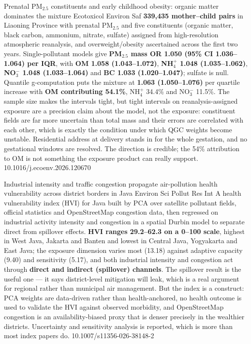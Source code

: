 \documentclass[10pt]{article}
\begin{document}

{Prenatal PM$_{2.5}$ constituents and early childhood obesity: organic matter dominates the mixture}
{Ecotoxicol Environ Saf}
{\textbf{339{,}435 mother--child pairs} in Liaoning Province with prenatal PM$_{2.5}$ and
five constituents (organic matter, black carbon, ammonium, nitrate, sulfate) assigned from
high-resolution atmospheric reanalysis, and overweight/obesity ascertained across the first
two years. Single-pollutant models give \textbf{PM$_{2.5}$ mass OR 1.050 (95\% CI
1.036--1.064) per IQR}, with \textbf{OM 1.058 (1.043--1.072)}, \textbf{NH$_4^+$ 1.048
(1.035--1.062)}, \textbf{NO$_3^-$ 1.048 (1.033--1.064)} and \textbf{BC 1.033
(1.020--1.047)}; sulfate is null. Quantile g-computation puts the mixture at \textbf{1.063
(1.050--1.076)} per quartile increase with \textbf{OM contributing 54.1\%}, NH$_4^+$ 34.4\%
and NO$_3^-$ 11.5\%. The sample size makes the intervals tight, but tight intervals on
reanalysis-assigned exposure are a precision claim about the model, not the exposure:
constituent fields are far more uncertain than total mass and their errors are correlated
with each other, which is exactly the condition under which QGC weights become unstable.
Residential address at delivery stands in for the whole gestation, and no gestational
windows are resolved. The direction is credible; the 54\% attribution to OM is not
something the exposure product can really support.}
{10.1016/j.ecoenv.2026.120670}


{Industrial intensity and traffic congestion propagate air-pollution health vulnerability across district borders in Java}
{Environ Sci Pollut Res Int}
{A health vulnerability index (HVI) for Java built by PCA over satellite pollutant fields,
official statistics and OpenStreetMap congestion data, then regressed on industrial
activity intensity and congestion in a spatial Durbin model to separate direct from
spillover effects. \textbf{HVI ranges 29.2--62.3 on a 0--100 scale}, highest in West Java,
Jakarta and Banten and lowest in Central Java, Yogyakarta and East Java; the exposure
dimension varies most (13.18) against adaptive capacity (9.40) and sensitivity (5.17), and
both industrial intensity and congestion act through \textbf{direct and indirect
(spillover) channels}. The spillover result is the useful one --- it says district-level
mitigation will leak, which is a real argument for regional rather than municipal air
management. But the index is a construct: PCA weights are data-driven rather than
health-anchored, no health outcome is used to validate the HVI against observed morbidity,
and OpenStreetMap congestion is an availability-biased proxy that is denser precisely in
the wealthier districts. Uncertainty and sensitivity analysis is reported, which is more
than most index papers do.}
{10.1007/s11356-026-38148-2}
\end{document}
